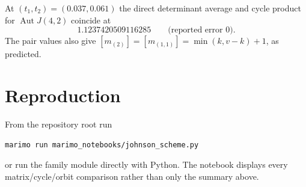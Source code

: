 \documentclass[11pt]{article}
\newcommand{\Aut}{\operatorname{Aut}}
\begin{document}
At $(t_1,t_2)=(0.037,0.061)$ the direct determinant average and cycle product
for $\Aut J(4,2)$ coincide at
\[
1.1237420509116285\qquad\text{(reported error $0$)}.
\]
The pair values also give $[m_{(2)}]=[m_{(1,1)}]=\min(k,v-k)+1$, as predicted.

\section{Reproduction}
From the repository root run
\begin{verbatim}
marimo run marimo_notebooks/johnson_scheme.py
\end{verbatim}
or run the family module directly with Python.  The notebook displays every
matrix/cycle/orbit comparison rather than only the summary above.
\end{document}
